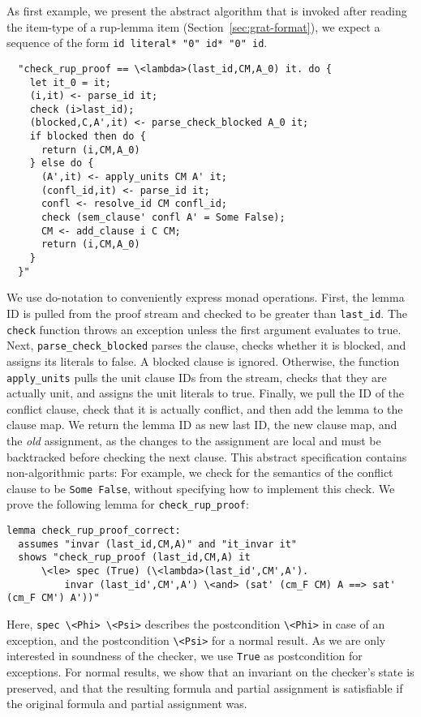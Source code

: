 \documentclass{llncs}
\newcommand{\isai}{\lstinline[language=isabelle,basicstyle=\normalsize\ttfamily\slshape]}
\begin{document}
As first example, we present the abstract algorithm that is invoked after reading the item-type of a rup-lemma item (\cf Section~\ref{sec:grat-format}),
\ie we expect a sequence of the form \lstinline[language={},literate={}]{id literal* "0" id* "0" id}.
\begin{lstlisting}
  "check_rup_proof == \<lambda>(last_id,CM,A_0) it. do {
    let it_0 = it;
    (i,it) <- parse_id it;
    check (i>last_id);
    (blocked,C,A',it) <- parse_check_blocked A_0 it;
    if blocked then do {
      return (i,CM,A_0)
    } else do {
      (A',it) <- apply_units CM A' it;
      (confl_id,it) <- parse_id it;
      confl <- resolve_id CM confl_id;
      check (sem_clause' confl A' = Some False);
      CM <- add_clause i C CM;
      return (i,CM,A_0)
    }
  }"
\end{lstlisting}
We use do-notation to conveniently express monad operations. 
First, the lemma ID is pulled from the proof stream and checked to be greater than \isai{last_id}.
The \isai$check$ function throws an exception unless the first argument evaluates to true.
Next, \isai{parse_check_blocked} parses the clause, checks whether it is blocked, and assigns its literals to false. A blocked clause is ignored. Otherwise, the function
\isai$apply_units$ pulls the unit clause IDs from the stream, checks that they are actually unit, and assigns the unit literals to true.
Finally, we pull the ID of the conflict clause, check that it is actually conflict, and then add the lemma to the clause map. 
We return the lemma ID as new last ID, the new clause map, and the \emph{old} assignment, as the changes to the assignment are local and must be backtracked before checking
the next clause.
This abstract specification contains non-algorithmic parts: For example, we check for the semantics of the conflict clause to be \isai{Some False}, without
specifying how to implement this check.
%
We prove the following lemma for \isai{check_rup_proof}:
\begin{lstlisting}
lemma check_rup_proof_correct: 
  assumes "invar (last_id,CM,A)" and "it_invar it"
  shows "check_rup_proof (last_id,CM,A) it 
      \<le> spec (True) (\<lambda>(last_id',CM',A'). 
          invar (last_id',CM',A') \<and> (sat' (cm_F CM) A ==> sat' (cm_F CM') A'))"  
\end{lstlisting}
Here, \isai{spec \<Phi> \<Psi>} describes the postcondition \isai$\<Phi>$ in case of an exception, and the postcondition \isai$\<Psi>$ for a normal result.
As we are only interested in soundness of the checker, we use \isai$True$ as postcondition for exceptions. For normal results, 
we show that an invariant on the checker's state is preserved, and that the resulting formula and partial assignment is satisfiable if the original formula and partial assignment was.
\end{document}

